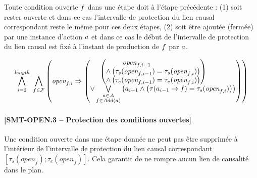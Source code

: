 Toute condition ouverte $f$ dans une étape doit à l'étape précédente : (1) soit rester ouverte et dans ce cas l'intervalle de protection du lien causal correspondant reste le même pour ces deux étapes, (2) soit être ajoutée (fermée) par une instance d'action $a$ et dans ce cas le début de l'intervalle de protection du lien causal est fixé à l'instant de production de $f$ par $a$.

\begin{small}
\[
\BigforallTwo{i=2}{\length}~\Bigforall{\substack{\f\in \F}}%
\begin{pmatrix}\open{\f}{i} \Rightarrow%
\begin{pmatrix}\begin{pmatrix}\open{\f}{i-1}\hfill\\ \wedge %
\left(\tau_{s}(\open{\f}{i-1}) = \tau_{s}(\open{\f}{i})\right)\hfill\\
 \wedge \left(\tau_{e}(\open{\f}{i-1}) = \tau_{e}(\open{\f}{i})
 \right)\end{pmatrix}\hfill\\
 \vee \bigvee\limits_{\substack{\a\in \A\\\f \in \add{\a}}}\left(\a_{i - 1} \wedge \left(\tau(\a_{i - 1}\rightarrow \f) = \tau_{s}(\open{\f}{i})\right)\right)\hfill\\
 \end{pmatrix}\end{pmatrix}%
\]
\end{small}


\paragraph*{[SMT-OPEN.3 -- Protection des conditions ouvertes]}

Une condition ouverte dans une étape donnée ne peut pas être supprimée à l'intérieur de l'intervalle de protection du lien causal correspondant $[\tau_{s}(\textit{open}_{f});\tau_{e}(\textit{open}_{f})]$. Cela garantit de ne rompre aucun lien de causalité dans le plan.

